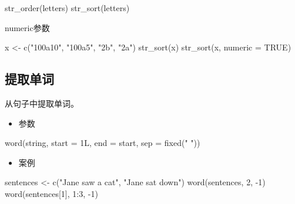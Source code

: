 \documentclass[
]{book}
\newenvironment{Shaded}{\begin{snugshade}}{\end{snugshade}}
\newcommand{\AttributeTok}[1]{\textcolor[rgb]{0.77,0.63,0.00}{#1}}
\newcommand{\ConstantTok}[1]{\textcolor[rgb]{0.00,0.00,0.00}{#1}}
\newcommand{\DecValTok}[1]{\textcolor[rgb]{0.00,0.00,0.81}{#1}}
\newcommand{\FunctionTok}[1]{\textcolor[rgb]{0.00,0.00,0.00}{#1}}
\newcommand{\NormalTok}[1]{#1}
\newcommand{\OtherTok}[1]{\textcolor[rgb]{0.56,0.35,0.01}{#1}}
\newcommand{\SpecialCharTok}[1]{\textcolor[rgb]{0.00,0.00,0.00}{#1}}
\newcommand{\StringTok}[1]{\textcolor[rgb]{0.31,0.60,0.02}{#1}}
\providecommand{\tightlist}{%
  \setlength{\itemsep}{0pt}\setlength{\parskip}{0pt}}
\begin{document}
\begin{Shaded}
\begin{Highlighting}[]
\FunctionTok{str\_order}\NormalTok{(letters)}
\FunctionTok{str\_sort}\NormalTok{(letters)}
\end{Highlighting}
\end{Shaded}

numeric参数

\begin{Shaded}
\begin{Highlighting}[]
\NormalTok{x }\OtherTok{\textless{}{-}} \FunctionTok{c}\NormalTok{(}\StringTok{"100a10"}\NormalTok{, }\StringTok{"100a5"}\NormalTok{, }\StringTok{"2b"}\NormalTok{, }\StringTok{"2a"}\NormalTok{)}
\FunctionTok{str\_sort}\NormalTok{(x)}
\FunctionTok{str\_sort}\NormalTok{(x, }\AttributeTok{numeric =} \ConstantTok{TRUE}\NormalTok{)}
\end{Highlighting}
\end{Shaded}

\hypertarget{ux63d0ux53d6ux5355ux8bcd}{%
\subsection{提取单词}\label{ux63d0ux53d6ux5355ux8bcd}}

从句子中提取单词。

\begin{itemize}
\tightlist
\item
  参数
\end{itemize}

\begin{Shaded}
\begin{Highlighting}[]
\FunctionTok{word}\NormalTok{(string, }\AttributeTok{start =}\NormalTok{ 1L, }\AttributeTok{end =}\NormalTok{ start, }\AttributeTok{sep =} \FunctionTok{fixed}\NormalTok{(}\StringTok{" "}\NormalTok{))}
\end{Highlighting}
\end{Shaded}

\begin{itemize}
\tightlist
\item
  案例
\end{itemize}

\begin{Shaded}
\begin{Highlighting}[]
\NormalTok{sentences }\OtherTok{\textless{}{-}} \FunctionTok{c}\NormalTok{(}\StringTok{"Jane saw a cat"}\NormalTok{, }\StringTok{"Jane sat down"}\NormalTok{)}
\FunctionTok{word}\NormalTok{(sentences, }\DecValTok{2}\NormalTok{, }\SpecialCharTok{{-}}\DecValTok{1}\NormalTok{)}
\FunctionTok{word}\NormalTok{(sentences[}\DecValTok{1}\NormalTok{], }\DecValTok{1}\SpecialCharTok{:}\DecValTok{3}\NormalTok{, }\SpecialCharTok{{-}}\DecValTok{1}\NormalTok{)}
\end{Highlighting}
\end{Shaded}
\end{document}
